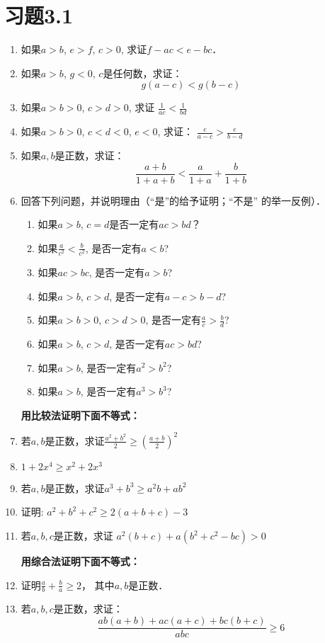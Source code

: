 \section*{习题3.1}
\begin{enumerate}
    \item 如果$a>b$, $e>f$, $c>0$, 求证$f-ac<e-bc$．
    \item 如果$a>b$, $g<0$, $c$是任何数，求证：
   \[ g(a-c)<g(b-c)\]

   \item   如果$a>b>0$, $c>d>0$, 求证
   $\frac{1}{ac}<\frac{1}{bd}$
   \item 如果$a>b>0$, $c<d<0$, $e<0$, 求证：
   $\frac{e}{a-c}>\frac{e}{b-d}$
   \item 如果$a,b$是正数，求证：
   \[\frac{a+b}{1+a+b}<\frac{a}{1+a}+\frac{b}{1+b}\]
   \item 回答下列问题，并说明理由（“是”的给予证明；“不是”
   的举一反例）．
\begin{enumerate}
    \item 如果$a>b$, $c=d$是否一定有$ac>bd$？
    \item 如果$\frac{a}{c^2}<\frac{b}{c^2}$,
    是否一定有$a<b$?
    \item 如果$ac>bc$, 是否一定有$a>b$?
    \item 如果$a>b$, $c>d$, 是否一定有$a-c>b-d$?
    \item 如果$a>b>0$, $c>d>0$, 是否一定有$\frac{a}{c}>\frac{b}{d}$?
    \item 如果$a>b$, $c>d$, 是否一定有$ac>bd$?
    \item 如果$a>b$, 是否一定有$a^2>b^2$?
    \item 如果$a>b$, 是否一定有$a^3>b^3$?
\end{enumerate}

\textbf{用比较法证明下面不等式：}
\item 若$a,b$是正数，求证$\frac{a^2+b^2}{2}\ge \left(\frac{a+b}{2}\right)^2$
\item $1+2x^4\ge x^2+2x^3$
\item 若$a,b$是正数，求证$a^3+b^3\ge a^2b+ab^2$
\item 证明: $a^2+b^2+c^2\ge 2(a+b+c)-3$
\item 若$a,b,c$是正数，求证
$a^2(b+c) +a(b^2+c^2-bc)> 0$


\textbf{用综合法证明下面不等式：}
\item 证明$\frac{a}{b}+\frac{b}{a}\ge 2$， 其中$a,b$是正数．
\item 若$a,b,c$是正数，求证：
\[\frac{ab(a+b)+ac(a+c)+bc(b+c)}{abc}\ge 6\]



\end{enumerate}
